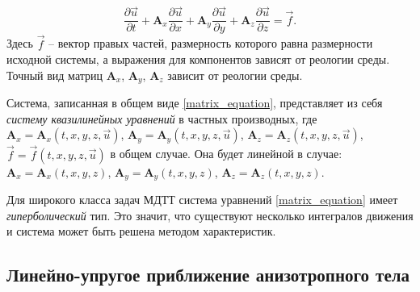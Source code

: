 \begin{equation}
	\label{matrix_equation}
	\frac{\partial\vec{u}}{\partial{t}}+\mathbf{A}_x\frac{\partial\vec{u}}{\partial{x}}+
	\mathbf{A}_y\frac{\partial\vec{u}}{\partial{y}}+
	\mathbf{A}_z\frac{\partial\vec{u}}{\partial{z}}=\vec{f}.
\end{equation}
	Здесь $\vec{f}$ -- вектор правых частей, размерность которого равна размерности исходной системы, а выражения для компонентов зависят от реологии среды.
	Точный вид матриц $\mathbf{A}_x$, $\mathbf{A}_y$, $\mathbf{A}_z$ зависит от реологии среды.
	
	Система, записанная в общем виде \eqref{matrix_equation}, представляет из себя \textit{систему квазилинейных уравнений} в частных производных\cite{rozhdestvenskiy}, где $\mathbf{A}_x = \mathbf{A}_x(t, x, y, z, \vec{u})$, $\mathbf{A}_y = \mathbf{A}_y(t, x, y, z, \vec{u})$, $\mathbf{A}_z = \mathbf{A}_z(t, x, y, z, \vec{u})$, $\vec{f} = \vec{f}(t, x, y, z, \vec{u})$ в общем случае.
	Она будет линейной в случае: $\mathbf{A}_x = \mathbf{A}_x(t, x, y, z)$, $\mathbf{A}_y = \mathbf{A}_y(t, x, y, z)$, $\mathbf{A}_z = \mathbf{A}_z(t, x, y, z)$.
	
	Для широкого класса задач МДТТ система уравнений \eqref{matrix_equation} имеет \textit{гиперболический} тип. Это значит, что существуют несколько интегралов движения и система может быть решена методом характеристик.
\clearpage
\newpage

\subsection{Линейно-упругое приближение анизотропного тела}


